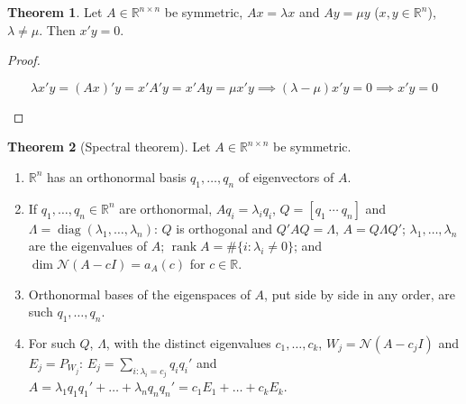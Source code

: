 \documentclass[12pt]{article}
\newcommand{\R}{\mathbb R}
\DeclareMathOperator{\diag}{diag}
\DeclareMathOperator{\rank}{rank}
\theoremstyle{definition}
\newtheorem{theorem}{Theorem}
\begin{document}
\begin{theorem}\label{h-thm-sym-orth}
Let \(A\in\R^{n\times n}\) be symmetric, \(Ax=\lambda x\) and \(Ay=\mu y\) (\(x,y\in\R^n\)), \(\lambda\ne\mu\). Then
\(x'y=0\).
\end{theorem}
\begin{proof}
\begin{board}
\[
\lambda x'y=(Ax)'y=x'A'y=x'Ay=\mu x'y\implies(\lambda-\mu)x'y=0\implies x'y=0
\]
\end{board}
\nopagebreak
\end{proof}

\begin{theorem}[Spectral theorem]\label{h-thm-spectral}
Let \(A\in\R^{n\times n}\) be symmetric.
\begin{enumerate}
\item \(\R^n\) has an orthonormal basis \(q_1,\dots,q_n\) of eigenvectors of \(A\).
\item If \(q_1,\dots,q_n\in\R^n\) are orthonormal, \(Aq_i=\lambda_iq_i\), \(Q=[q_1\ \cdots\ q_n]\) and
\(\Lambda=\diag(\lambda_1,\dots,\lambda_n)\): \(Q\) is orthogonal and \(Q'AQ=\Lambda\), \(A=Q\Lambda Q'\);
\(\lambda_1,\dots,\lambda_n\) are the eigenvalues of \(A\); \(\rank A=\#\{i:\lambda_i\ne0\}\); and
\(\dim\mathcal N(A-cI)=a_A(c)\) for \(c\in\R\).
\item Orthonormal bases of the eigenspaces of \(A\), put side by side in any order, are such \(q_1,\dots,q_n\).
\item For such \(Q\), \(\Lambda\), with the distinct eigenvalues \(c_1,\dots,c_k\), \(W_j=\mathcal N(A-c_jI)\) and
\(E_j=P_{W_j}\): \(E_j=\sum_{i:\lambda_i=c_j}q_iq_i'\) and \(A=\lambda_1q_1q_1'+\dots+\lambda_nq_nq_n'=c_1E_1+\dots+c_kE_k\).
\end{enumerate}
\end{theorem}
\end{document}
